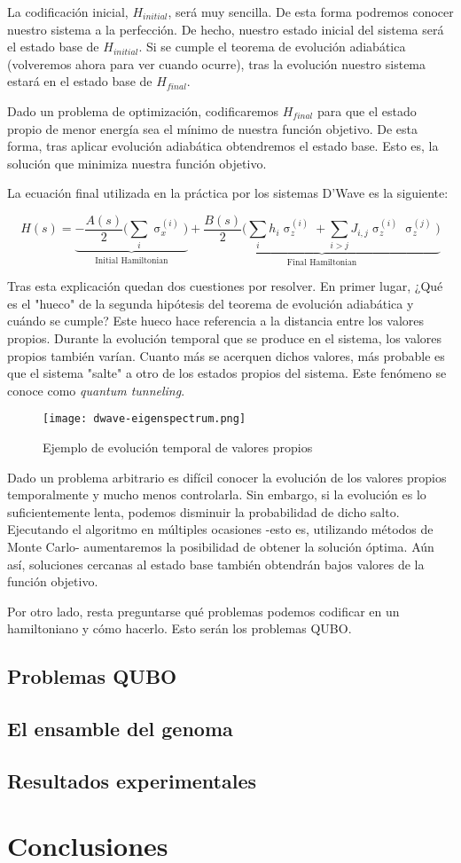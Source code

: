 \documentclass[11pt]{article}
\begin{document}
La codificación inicial, $H_{initial}$, será muy sencilla. De esta forma podremos conocer nuestro sistema a la perfección. De hecho, nuestro estado inicial del sistema será el estado base de $H_{initial}$. Si se cumple el teorema de evolución adiabática (volveremos ahora para ver cuando ocurre), tras la evolución nuestro sistema estará en el estado base de $H_{final}$.

Dado un problema de optimización, codificaremos $H_{final}$ para que el estado propio de menor energía sea el mínimo de nuestra función objetivo. De esta forma, tras aplicar evolución adiabática obtendremos el estado base. Esto es, la solución que minimiza nuestra función objetivo.

La ecuación final utilizada en la práctica por los sistemas D'Wave es la siguiente:

$$ H(s) = \underbrace{- \frac{A(s)}{2} \bigg( \sum_i \upsigma_x^{(i)} \bigg)}_\text{Initial Hamiltonian} 
+ \underbrace{\frac{B(s)}{2} \bigg( \sum_i h_i \upsigma_z^{(i)} + \sum_ {i > j} J_{i,j} \upsigma_z^{(i)} \upsigma_z^{(j)} \bigg)}_\text{Final Hamiltonian} $$

Tras esta explicación quedan dos cuestiones por resolver. En primer lugar, ¿Qué es el "hueco" de la segunda hipótesis del teorema de evolución adiabática y cuándo se cumple? Este hueco hace referencia a la distancia entre los valores propios. Durante la evolución temporal que se produce en el sistema, los valores propios también varían. Cuanto más se acerquen dichos valores, más probable es que el sistema "salte" a otro de los estados propios del sistema. Este fenómeno se conoce como \emph{quantum tunneling}.

\begin{figure}[h]
	\texttt{[image: dwave-eigenspectrum.png]}
	\centering
	\caption{Ejemplo de evolución temporal de valores propios}
	\label{fig:dwave-eigenspectrum}
\end{figure}

Dado un problema arbitrario es difícil conocer la evolución de los valores propios temporalmente y mucho menos controlarla. Sin embargo, si la evolución es lo suficientemente lenta, podemos disminuir la probabilidad de dicho salto. Ejecutando el algoritmo en múltiples ocasiones -esto es, utilizando métodos de Monte Carlo- aumentaremos la posibilidad de obtener la solución óptima. Aún así, soluciones cercanas al estado base también obtendrán bajos valores de la función objetivo.

Por otro lado, resta preguntarse qué problemas podemos codificar en un hamiltoniano y cómo hacerlo. Esto serán los problemas QUBO.

\subsection{Problemas QUBO}

\subsection{El ensamble del genoma}

\subsection{Resultados experimentales}

\section{Conclusiones}
\end{document}
